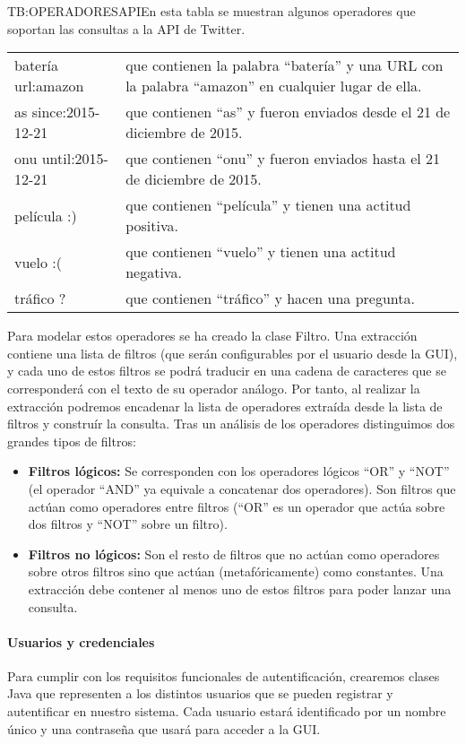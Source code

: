 \begin{table}[Operadores de Twitter API]{TB:OPERADORESAPI}{En esta tabla se muestran algunos operadores que soportan las consultas a la API de Twitter.}
\begin{tabular}{|p{3.5cm}|p{11.5cm}|}
batería url:amazon & que contienen la palabra ``batería'' y una URL con la palabra ``amazon'' en cualquier lugar de ella.\\
as since:2015-12-21 & que contienen ``as'' y fueron enviados desde el 21 de diciembre de 2015.\\
onu until:2015-12-21 & que contienen ``onu'' y fueron enviados hasta el 21 de diciembre de 2015.\\
película :) & que contienen ``película'' y tienen una actitud positiva.\\
vuelo :( & que contienen ``vuelo'' y tienen una actitud negativa.\\
tráfico ? & que contienen ``tráfico'' y hacen una pregunta. \\
\hline
\end{tabular}
\end{table}

Para modelar estos operadores se ha creado la clase Filtro. Una extracción contiene una lista de filtros (que serán configurables por el usuario desde la GUI), y cada uno de estos filtros se podrá traducir en una cadena de caracteres que se corresponderá con el texto de su operador análogo.
Por tanto, al realizar la extracción podremos encadenar la lista de operadores extraída desde la lista de filtros y construír la consulta. 
Tras un análisis de los operadores distinguimos dos grandes tipos de filtros:
\begin{itemize}
\item \textbf{Filtros lógicos:} Se corresponden con los operadores lógicos ``OR'' y ``NOT'' (el operador ``AND'' ya equivale a concatenar dos operadores). Son filtros que actúan como operadores entre filtros (``OR'' es un operador que actúa sobre dos filtros y ``NOT'' sobre un filtro).
\item\textbf{Filtros no lógicos:} Son el resto de filtros que no actúan como operadores sobre otros filtros sino que actúan (metafóricamente) como constantes. Una extracción debe contener al menos uno de estos filtros para poder lanzar una consulta. 
\end{itemize}
\paragraph{Usuarios y credenciales}
Para cumplir con los requisitos funcionales de autentificación, crearemos clases Java que representen a los distintos usuarios que se pueden registrar y autentificar en nuestro sistema. Cada usuario estará identificado por un nombre único y una contraseña que usará para acceder a la GUI.
